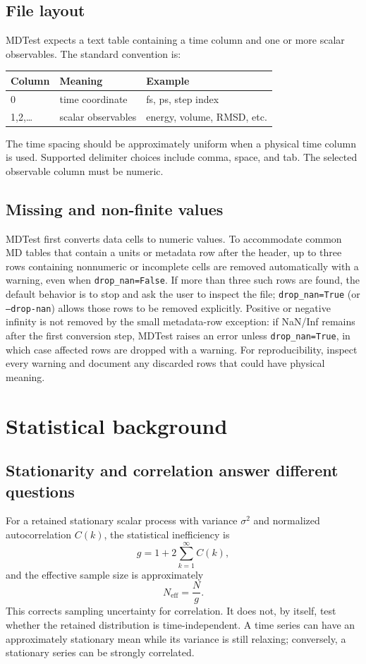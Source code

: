\documentclass[11pt,oneside]{report}
\newcommand{\Neff}{N_{\mathrm{eff}}}
\begin{document}
\section{File layout}
MDTest expects a text table containing a time column and one or more scalar observables. The standard convention is:
\begin{center}
\begin{tabular}{lll}
\toprule
Column & Meaning & Example\\
\midrule
0 & time coordinate & fs, ps, step index\\
1,2,\ldots & scalar observables & energy, volume, RMSD, etc.\\
\bottomrule
\end{tabular}
\end{center}
The time spacing should be approximately uniform when a physical time column is used. Supported delimiter choices include comma, space, and tab. The selected observable column must be numeric.

\section{Missing and non-finite values}
MDTest first converts data cells to numeric values.  To accommodate common MD tables that contain a units or metadata row after the header, up to three rows containing nonnumeric or incomplete cells are removed automatically with a warning, even when \texttt{drop\_nan=False}.  If more than three such rows are found, the default behavior is to stop and ask the user to inspect the file; \texttt{drop\_nan=True} (or \texttt{--drop-nan}) allows those rows to be removed explicitly.  Positive or negative infinity is not removed by the small metadata-row exception: if NaN/Inf remains after the first conversion step, MDTest raises an error unless \texttt{drop\_nan=True}, in which case affected rows are dropped with a warning.  For reproducibility, inspect every warning and document any discarded rows that could have physical meaning.

\chapter{Statistical background}
\section{Stationarity and correlation answer different questions}
For a retained stationary scalar process with variance $\sigma^2$ and normalized autocorrelation $C(k)$, the statistical inefficiency is
\begin{equation}
 g = 1+2\sum_{k=1}^{\infty}C(k),
\end{equation}
and the effective sample size is approximately
\begin{equation}
 \Neff = \frac{N}{g}.
\end{equation}
This corrects sampling uncertainty for correlation. It does not, by itself, test whether the retained distribution is time-independent. A time series can have an approximately stationary mean while its variance is still relaxing; conversely, a stationary series can be strongly correlated.
\end{document}
